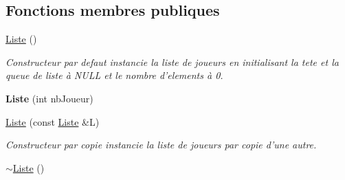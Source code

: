 \subsection*{\-Fonctions membres publiques}
\begin{DoxyCompactItemize}
\item 
\hypertarget{class_liste_a26368f966a6cfb9d8320603871d9f316}{\hyperlink{class_liste_a26368f966a6cfb9d8320603871d9f316}{\-Liste} ()}\label{class_liste_a26368f966a6cfb9d8320603871d9f316}

\begin{DoxyCompactList}\small\item\em \-Constructeur par defaut instancie la liste de joueurs en initialisant la tete et la queue de liste à \-N\-U\-L\-L et le nombre d'elements à 0. \end{DoxyCompactList}\item 
\hypertarget{class_liste_a6f56e7818ca43136ec0a9b01a774acba}{{\bfseries \-Liste} (int nb\-Joueur)}\label{class_liste_a6f56e7818ca43136ec0a9b01a774acba}

\item 
\hypertarget{class_liste_a04be50fd0b3b37110cc36e151a9c945a}{\hyperlink{class_liste_a04be50fd0b3b37110cc36e151a9c945a}{\-Liste} (const \hyperlink{class_liste}{\-Liste} \&\-L)}\label{class_liste_a04be50fd0b3b37110cc36e151a9c945a}

\begin{DoxyCompactList}\small\item\em \-Constructeur par copie instancie la liste de joueurs par copie d'une autre. \end{DoxyCompactList}\item 
\hypertarget{class_liste_ac9bb3dba05e5884a536e54af86552177}{\hyperlink{class_liste_ac9bb3dba05e5884a536e54af86552177}{$\sim$\-Liste} ()}\label{class_liste_ac9bb3dba05e5884a536e54af86552177}


\end{DoxyCompactItemize}

